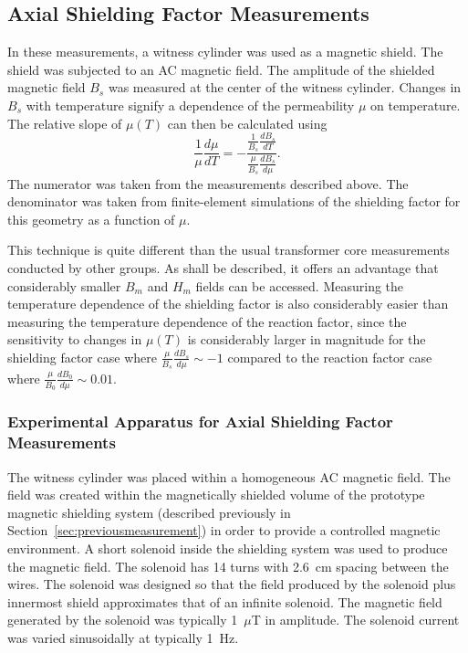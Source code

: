 
\subsection{Axial Shielding Factor Measurements\label{sec:axial}}


In these measurements, a witness cylinder was used as a magnetic
shield.  The shield was subjected to an AC magnetic field.  The
amplitude of the shielded magnetic field $B_s$ was measured at the
center of the witness cylinder.  Changes in $B_s$ with temperature
signify a dependence of the permeability $\mu$ on temperature.  The
relative slope of $\mu(T)$ can then be calculated using
\begin{equation}
\frac{1}{\mu}\frac{d\mu}{dT}=-\frac{\frac{1}{B_s}\frac{dB_s}{dT}}{\frac{\mu}{B_s}\frac{dB_s}{d\mu}}.
\label{eqn:axial}
\end{equation}
The numerator was taken from the measurements described above. The
denominator was taken from finite-element simulations of the shielding
factor for this geometry as a function of $\mu$.

This technique is quite different than the usual transformer core
measurements conducted by other groups.  As shall be described, it
offers an advantage that considerably smaller $B_m$ and $H_m$ fields
can be accessed.  Measuring the temperature dependence of the
shielding factor is also considerably easier than measuring the
temperature dependence of the reaction factor, since the sensitivity
to changes in $\mu(T)$ is considerably larger in magnitude for the
shielding factor case where $\frac{\mu}{B_s}\frac{dB_s}{d\mu}\sim -1$
compared to the reaction factor case where
$\frac{\mu}{B_0}\frac{dB_0}{d\mu}\sim 0.01$.


\subsubsection{Experimental Apparatus for Axial Shielding Factor Measurements}

The witness cylinder was placed within a homogeneous AC magnetic
field.  The field was created within the magnetically shielded volume
of the prototype magnetic shielding system (described previously in
Section~\ref{sec:previousmeasurement}) in order to provide a
controlled magnetic environment.  A short solenoid inside the
shielding system was used to produce the magnetic field.
The solenoid has 14 turns with 2.6~cm spacing between the wires.  The
solenoid was designed so that the field produced by the solenoid plus
innermost shield approximates that of an infinite solenoid.  The
magnetic field generated by the solenoid was typically 1~$\mu$T in
amplitude.  The solenoid current was varied sinusoidally at typically
1~Hz.

